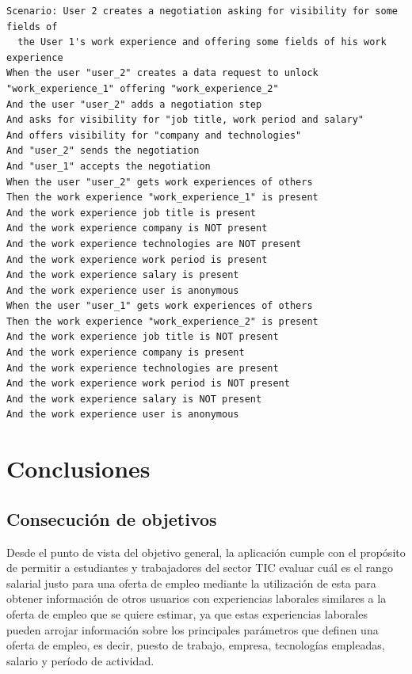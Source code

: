 \documentclass[a4paper, 12pt]{book}
\begin{document}
        {\scriptsize
    \linespread{1}
    \begin{verbatim}
Scenario: User 2 creates a negotiation asking for visibility for some fields of
  the User 1's work experience and offering some fields of his work experience
When the user "user_2" creates a data request to unlock "work_experience_1" offering "work_experience_2"
And the user "user_2" adds a negotiation step
And asks for visibility for "job title, work period and salary"
And offers visibility for "company and technologies"
And "user_2" sends the negotiation
And "user_1" accepts the negotiation
When the user "user_2" gets work experiences of others
Then the work experience "work_experience_1" is present
And the work experience job title is present
And the work experience company is NOT present
And the work experience technologies are NOT present
And the work experience work period is present
And the work experience salary is present
And the work experience user is anonymous
When the user "user_1" gets work experiences of others
Then the work experience "work_experience_2" is present
And the work experience job title is NOT present
And the work experience company is present
And the work experience technologies are present
And the work experience work period is NOT present
And the work experience salary is NOT present
And the work experience user is anonymous
    \end{verbatim}
    }



    \cleardoublepage


    \chapter{Conclusiones}
    \label{chap:conclusiones}


    \section{Consecución de objetivos}
    \label{sec:consecucion-objetivos}

    Desde el punto de vista del objetivo general, la aplicación cumple con el propósito de permitir a estudiantes
    y trabajadores del sector TIC evaluar cuál es el rango salarial justo para una oferta de empleo mediante la utilización
    de esta para obtener información de otros usuarios con experiencias laborales similares a la oferta de empleo que se
    quiere estimar, ya que estas experiencias laborales pueden arrojar información sobre los principales parámetros que
    definen una oferta de empleo, es decir, puesto de trabajo, empresa, tecnologías empleadas, salario y período de actividad.
\end{document}
